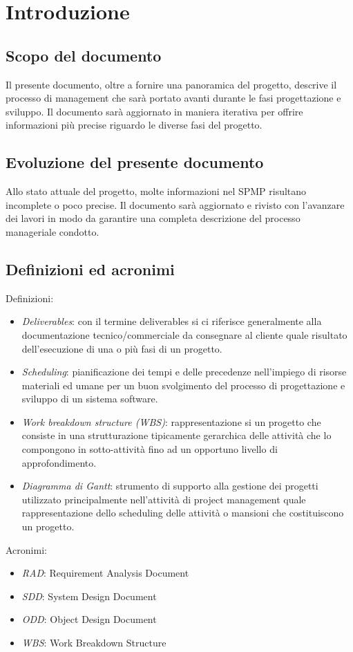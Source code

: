 \chapter{Introduzione}

\section{Scopo del documento}
		
Il presente documento, oltre a fornire una panoramica del progetto, descrive il processo di management che sarà portato avanti durante le fasi progettazione e sviluppo. Il documento sarà aggiornato in maniera iterativa per offrire informazioni più precise riguardo le diverse fasi del progetto. 


\section{Evoluzione del presente documento}

Allo stato attuale del progetto, molte informazioni nel SPMP risultano incomplete o poco precise. Il documento sarà aggiornato e rivisto con l'avanzare dei lavori in modo da garantire una completa descrizione del processo manageriale condotto.


\section{Definizioni ed acronimi}

Definizioni:			
\begin{itemize}
\item \emph{Deliverables}: con il termine deliverables si ci riferisce generalmente alla documentazione tecnico/commerciale da consegnare al cliente quale risultato dell'esecuzione di una o più fasi di un progetto.
\item \emph{Scheduling}: pianificazione dei tempi e delle precedenze nell'impiego di risorse materiali ed umane per un buon svolgimento del processo di progettazione e sviluppo di un sistema software.
\item \emph{Work breakdown structure (WBS)}: rappresentazione si un progetto che consiste in una strutturazione tipicamente gerarchica delle attività che lo compongono in sotto-attività fino ad un opportuno livello di approfondimento.
\item \emph{Diagramma di Gantt}: strumento di supporto alla gestione dei progetti utilizzato principalmente nell'attività di project management quale rappresentazione dello scheduling delle attività o mansioni che costituiscono un progetto.
\end{itemize}	

Acronimi:
\begin{itemize}
\item \emph{RAD}: Requirement Analysis Document
\item \emph{SDD}: System Design Document
\item \emph{ODD}: Object Design Document
\item \emph{WBS}: Work Breakdown Structure
\end{itemize}